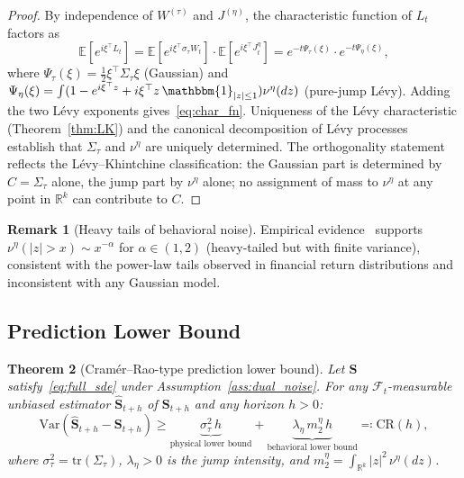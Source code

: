 \documentclass[12pt,a4paper]{article}
\theoremstyle{plain}
\newtheorem{theorem}{Theorem}[section]
\theoremstyle{definition}
\newtheorem{remark}[theorem]{Remark}
\newcommand{\R}{\mathbb{R}}
\newcommand{\E}{\mathbb{E}}
\newcommand{\F}{\mathcal{F}}
\newcommand{\tr}{\mathrm{tr}}
\newcommand{\Var}{\mathrm{Var}}
\newcommand{\1}{\mathbbm{1}}
\begin{document}
\begin{proof}
By independence of $W^{(\tau)}$ and $J^{(\eta)}$, the characteristic function
of $L_t$ factors as
\[
\E[e^{i\xi^\top L_t}]
= \E[e^{i\xi^\top \sigma_\tau W_t}]\cdot\E[e^{i\xi^\top J_t^\eta}]
= e^{-t\Psi_\tau(\xi)}\cdot e^{-t\Psi_\eta(\xi)},
\]
where $\Psi_\tau(\xi) = \frac{1}{2}\xi^\top\Sigma_\tau\xi$ (Gaussian) and
$\Psi_\eta(\xi) = \int(1-e^{i\xi^\top z}+i\xi^\top z\,\1_{|z|\leq 1})\nu^\eta(dz)$
(pure-jump Lévy). Adding the two Lévy exponents gives~\eqref{eq:char_fn}.
Uniqueness of the Lévy characteristic (Theorem~\ref{thm:LK}) and the
canonical decomposition of Lévy processes~\citep{Sato1999} establish that
$\Sigma_\tau$ and $\nu^\eta$ are uniquely determined. The orthogonality
statement reflects the Lévy--Khintchine classification: the Gaussian part is
determined by $C = \Sigma_\tau$ alone, the jump part by $\nu^\eta$ alone;
no assignment of mass to $\nu^\eta$ at any point in $\R^k$ can contribute
to $C$.
\end{proof}

\begin{remark}[Heavy tails of behavioral noise]
Empirical evidence~\citep{ContBouchaud2000,LuxMarchesi1999} supports
$\nu^\eta(|z|>x) \sim x^{-\alpha}$ for $\alpha \in (1,2)$ (heavy-tailed
but with finite variance), consistent with the power-law tails observed in
financial return distributions and inconsistent with any Gaussian model.
\end{remark}

\subsection{Prediction Lower Bound}

\begin{theorem}[Cramér--Rao-type prediction lower bound]
\label{thm:cramer_rao}
Let $\mathbf{S}$ satisfy~\eqref{eq:full_sde} under Assumption~\ref{ass:dual_noise}.
For any $\F_t$-measurable unbiased estimator $\hat{\mathbf{S}}_{t+h}$ of
$\mathbf{S}_{t+h}$ and any horizon $h > 0$:
\begin{equation}
\label{eq:CR_bound}
\Var\!\left(\hat{\mathbf{S}}_{t+h} - \mathbf{S}_{t+h}\right)
\geq \underbrace{\sigma_\tau^2\,h}_{\text{physical lower bound}}
   + \underbrace{\lambda_\eta\,m_2^\eta\,h}_{\text{behavioral lower bound}}
\eqqcolon \mathrm{CR}(h),
\end{equation}
where $\sigma_\tau^2 = \tr(\Sigma_\tau)$, $\lambda_\eta > 0$ is the jump
intensity, and $m_2^\eta = \int_{\R^k}|z|^2\,\nu^\eta(dz)$.
\end{theorem}
\end{document}
